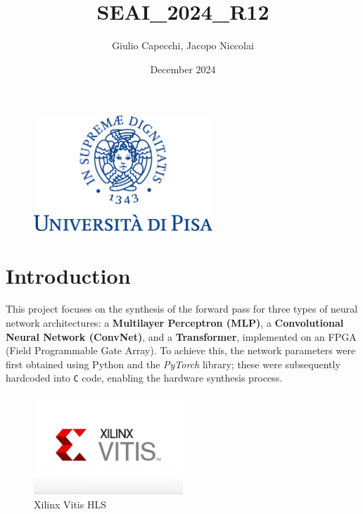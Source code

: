 \documentclass{article}
\title{SEAI\_2024\_R12}
\author{Giulio Capecchi, Jacopo Niccolai}
\date{December 2024}
\begin{document}
\maketitle

\vspace{3cm}
\begin{figure}[H]
    \centering
    \includegraphics[width=0.6\textwidth]{assets/unipi.png}
    \label{fig:unipi_logo}
\end{figure}

\newpage

\tableofcontents

\newpage

\section{Introduction}
This project focuses on the synthesis of the forward pass for three types of neural network architectures: a \textbf{Multilayer Perceptron (MLP)}, a \textbf{Convolutional Neural Network (ConvNet)}, and a \textbf{Transformer}, implemented on an FPGA (Field Programmable Gate Array).  To achieve this, the network parameters were first obtained using Python and the \textit{PyTorch} library; these were subsequently hardcoded into \texttt{C} code, enabling the hardware synthesis process.


\begin{figure}[H]
    \centering
    \includegraphics[width=0.5\textwidth]{assets/vitis-hls.png}
    \caption{Xilinx Vitis HLS}
    \label{fig:vitis_hls}
\end{figure}
\end{document}
